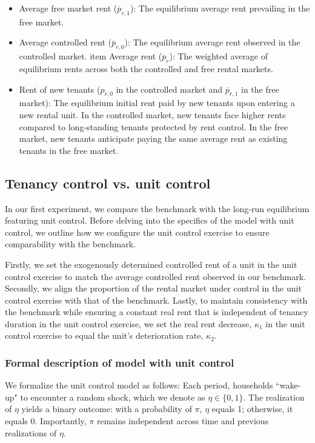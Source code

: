 \documentclass[parskip=full]{article}
\begin{document}
\begin{itemize}
    \item Average free market rent ($\overline{p}_{r,1}$): The equilibrium average rent prevailing in the free market.
    \item Average controlled rent ($\overline{p}_{r,0}$): The equilibrium average rent observed in the controlled market.
    item Average rent ($\overline{p}_{r}$): The weighted average of equilibrium rents across both the controlled and free rental markets.
    \item Rent of new tenants ($p_{r,0}$ in the controlled market and $\overline{p}_{r,1}$ in the free market): The equilibrium initial rent paid by new tenants upon entering a new rental unit. In the controlled market, new tenants face higher rents compared to long-standing tenants protected by rent control. In the free market, new tenants anticipate paying the same average rent as existing tenants in the free market.
\end{itemize}

\subsection{Tenancy control vs. unit control}

In our first experiment, we compare the benchmark with the long-run equilibrium featuring unit control. Before delving into the specifics of the model with unit control, we outline how we configure the unit control exercise to ensure comparability with the benchmark.

Firstly, we set the exogenously determined controlled rent of a unit in the unit control exercise to match the average controlled rent observed in our benchmark. Secondly, we align the proportion of the rental market under control in the unit control exercise with that of the benchmark. Lastly, to maintain consistency with the benchmark while ensuring a constant real rent that is independent of tenancy duration in the unit control exercise, we set the real rent decrease, $\kappa_{1}$ in the unit control exercise to equal the unit's deterioration rate, $\kappa_{2}$.

\subsubsection{Formal description of model with unit control}

We formalize the unit control model as follows: Each period, households ``wake-up" to encounter a random shock, which we denote as $\eta \in \{0,1\}$. The realization of $\eta$ yields a binary outcome: with a probability of $\pi$, $\eta$ equals 1; otherwise, it equals 0. Importantly, $\pi$ remains independent across time and previous realizations of $\eta$.
\end{document}
